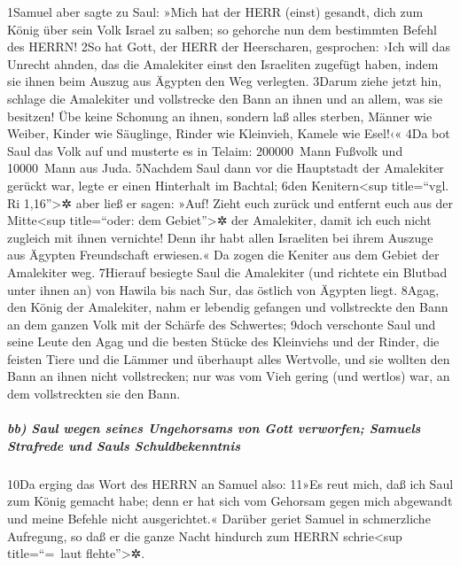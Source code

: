 1Samuel aber sagte zu Saul: »Mich hat der HERR (einst) gesandt, dich zum
König über sein Volk Israel zu salben; so gehorche nun dem bestimmten
Befehl des HERRN! 2So hat Gott, der HERR der Heerscharen, gesprochen:
›Ich will das Unrecht ahnden, das die Amalekiter einst den Israeliten
zugefügt haben, indem sie ihnen beim Auszug aus Ägypten den Weg
verlegten. 3Darum ziehe jetzt hin, schlage die Amalekiter und
vollstrecke den Bann an ihnen und an allem, was sie besitzen! Übe keine
Schonung an ihnen, sondern laß alles sterben, Männer wie Weiber, Kinder
wie Säuglinge, Rinder wie Kleinvieh, Kamele wie Esel!‹« 4Da bot Saul das
Volk auf und musterte es in Telaim: 200000~Mann Fußvolk und 10000~Mann
aus Juda. 5Nachdem Saul dann vor die Hauptstadt der Amalekiter gerückt
war, legte er einen Hinterhalt im Bachtal; 6den Kenitern\textless sup
title=``vgl. Ri 1,16''\textgreater✲ aber ließ er sagen: »Auf! Zieht euch
zurück und entfernt euch aus der Mitte\textless sup title=``oder: dem
Gebiet''\textgreater✲ der Amalekiter, damit ich euch nicht zugleich mit
ihnen vernichte! Denn ihr habt allen Israeliten bei ihrem Auszuge aus
Ägypten Freundschaft erwiesen.« Da zogen die Keniter aus dem Gebiet der
Amalekiter weg. 7Hierauf besiegte Saul die Amalekiter (und richtete ein
Blutbad unter ihnen an) von Hawila bis nach Sur, das östlich von Ägypten
liegt. 8Agag, den König der Amalekiter, nahm er lebendig gefangen und
vollstreckte den Bann an dem ganzen Volk mit der Schärfe des Schwertes;
9doch verschonte Saul und seine Leute den Agag und die besten Stücke des
Kleinviehs und der Rinder, die feisten Tiere und die Lämmer und
überhaupt alles Wertvolle, und sie wollten den Bann an ihnen nicht
vollstrecken; nur was vom Vieh gering (und wertlos) war, an dem
vollstreckten sie den Bann.

\hypertarget{bb-saul-wegen-seines-ungehorsams-von-gott-verworfen-samuels-strafrede-und-sauls-schuldbekenntnis}{%
\subparagraph{bb) Saul wegen seines Ungehorsams von Gott verworfen;
Samuels Strafrede und Sauls
Schuldbekenntnis}\label{bb-saul-wegen-seines-ungehorsams-von-gott-verworfen-samuels-strafrede-und-sauls-schuldbekenntnis}}

10Da erging das Wort des HERRN an Samuel also: 11»Es reut mich, daß ich
Saul zum König gemacht habe; denn er hat sich vom Gehorsam gegen mich
abgewandt und meine Befehle nicht ausgerichtet.« Darüber geriet Samuel
in schmerzliche Aufregung, so daß er die ganze Nacht hindurch zum HERRN
schrie\textless sup title=``=~laut flehte''\textgreater✲.

